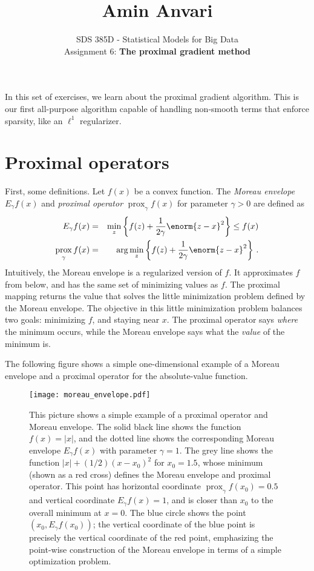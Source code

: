 \documentclass{article}
\title{Amin Anvari}
\date{}
\author{SDS 385D - Statistical Models for Big Data\\ Assignment 6: \textbf{The proximal gradient method}}
\date{}  %
\DeclareMathOperator*{\prox}{prox}
\begin{document}
\maketitle%

\bigskip

In this set of exercises, we learn about the proximal gradient algorithm.  This is our first all-purpose algorithm capable of handling non-smooth terms that enforce sparsity, like an $\ell^1$ regularizer.

\section{Proximal operators}

First, some definitions.  Let $f(x)$ be a convex function.  The \textit{Moreau envelope} $E_{\gamma} f(x)$ and \textit{proximal operator} $\prox_{\gamma} f(x)$ for parameter $\gamma > 0$ are defined as
\begin{eqnarray}
E_{\gamma} f(x) &=& \min_{z } \left\{f(z) + \frac{1}{2\gamma} \enorm{z - x}^2  \right\}  \leq f(x) \\
\prox_{\gamma} f(x) &=& \arg \min_{z } \left\{  f(z)+ \frac{1}{2\gamma} \enorm{z - x}^2  \right\} \, .
\end{eqnarray}
Intuitively, the Moreau envelope is a regularized version of $f$.  It approximates $f$ from below, and has the same set of minimizing values as $f$.  The proximal mapping returns the value that solves the little minimization problem defined by the Moreau envelope.  The objective in this little minimization problem balances two goals: minimizing $f$, and staying near $x$.  The proximal operator says \textit{where} the minimum occurs, while the Moreau envelope says what the \textit{value} of the minimum is.

The following figure shows a simple one-dimensional example of a Moreau envelope and a proximal operator for the absolute-value function.

\begin{figure}[!h]
\texttt{[image: moreau\_envelope.pdf]}
\caption{This picture shows a simple example of a proximal operator and Moreau envelope.  The solid black line shows the function $f(x) = |x|$, and the dotted line shows the corresponding Moreau envelope $E_{\gamma} f (x)$ with parameter $\gamma=1$.  The grey line shows the function 
  $|x| + (1/2)(x-x_0)^2$ for $x_0 = 1.5$, whose minimum (shown as a red cross)
  defines the Moreau envelope and proximal operator.  This point has horizontal coordinate
  $\prox_\gamma f(x_0) = 0.5$ and vertical coordinate $E_{\gamma} f (x) = 1$, and is closer than $x_0$
  to the overall minimum at $x=0$.  The blue circle shows the point 
  $(x_0, E_{\gamma} f (x_0))$; the vertical coordinate of the blue point is precisely the vertical coordinate of the red point, emphasizing the point-wise construction of the Moreau
  envelope in terms of a simple optimization problem.
}
\end{figure}
\end{document}
